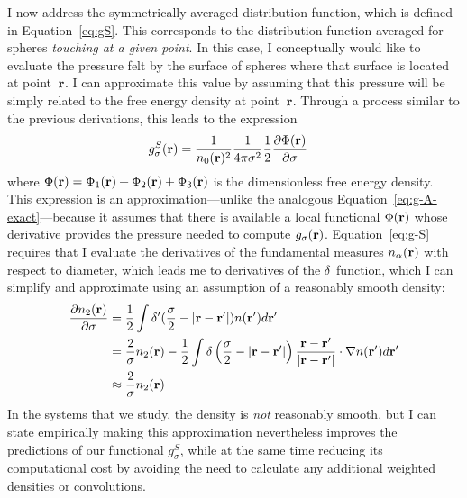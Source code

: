 I now address the symmetrically averaged distribution function, which
is defined in Equation~\ref{eq:gS}.  This corresponds to the
distribution function averaged for spheres \emph{touching at a given
  point}.  In this case, I conceptually would like to evaluate the
pressure felt by the surface of spheres where that surface is located
at point~$\textbf{r}$.  I can approximate this value by assuming that this
pressure will be simply related to the free energy density at
point~$\textbf{r}$.  Through a process similar to the previous derivations, this
leads to the expression
\begin{align}
  g_\sigma^S(\rr)%
  &= \frac{1}{n_0(\rr)^2}\frac{1}{ 4\pi \sigma^2}\frac12
  \frac{\partial \Phi(\rr)}{\partial \sigma} \label{eq:g-S}
\end{align}
where $\Phi(\textbf{r}) = \Phi_1(\textbf{r}) + \Phi_2(\textbf{r}) + \Phi_3(\textbf{r})$ is the
dimensionless free energy density.  This expression is an
approximation---unlike the analogous
Equation~\ref{eq:g-A-exact}---because it assumes that there is available a local functional $\Phi(\textbf{r})$ whose derivative provides the
pressure needed to compute $g_\sigma(\textbf{r})$.  Equation~\ref{eq:g-S}
requires that I evaluate the derivatives of the fundamental measures
$n_\alpha(\textbf{r})$ with respect to diameter, which leads me to
derivatives of the $\delta$~function, which I can simplify and
approximate using an assumption of a reasonably smooth density:
\begin{align}
  \frac{\partial n_2(\textbf{r})}{\partial \sigma}
  &= \frac12 \int \delta'(\frac\sigma2 - |\textbf{r}-\textbf{r}'|) n(\textbf{r}')d\textbf{r}' \\
  &= \frac2{\sigma}n_2(\textbf{r}) - \frac12 \int \delta\left(\frac\sigma2 - |\textbf{r}-\textbf{r}'|\right)
  \frac{\textbf{r}-\textbf{r}'}{|\textbf{r}-\textbf{r}'|}\cdot\mathbf{\nabla}n(\textbf{r}')d\textbf{r}' \\
  &\approx \frac{2}{\sigma}n_2(\textbf{r})
\end{align}
In the systems that we study, the density is \emph{not} reasonably
smooth, but I can state empirically making this approximation
nevertheless improves the predictions of our functional $g_\sigma^S$, while at the
same time reducing its computational cost by avoiding the need to
calculate any additional weighted densities or convolutions.


